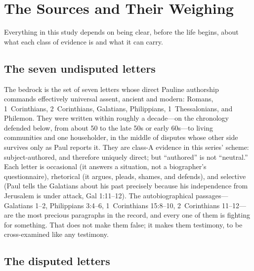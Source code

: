 \section{The Sources and Their Weighing}

Everything in this study depends on being clear, before the life begins,
about what each class of evidence is and what it can carry.

\subsection{The seven undisputed letters}

The bedrock is the set of seven letters whose direct Pauline authorship
commands effectively universal assent, ancient and modern: Romans,
1~Corinthians, 2~Corinthians, Galatians, Philippians, 1~Thessalonians, and
Philemon. They were written within roughly a decade---on the chronology
defended below, from about 50 to the late 50s or early 60s---to living
communities and one householder, in the middle of disputes whose other side
survives only as Paul reports it. They are class-A evidence in this
series' scheme: subject-authored, and therefore uniquely direct; but
``authored'' is not ``neutral.'' Each letter is occasional (it answers a
situation, not a biographer's questionnaire), rhetorical (it argues, pleads,
shames, and defends), and selective (Paul tells the Galatians about his past
precisely because his independence from Jerusalem is under attack, Gal
1:11--12). The autobiographical passages---Galatians 1--2, Philippians
3:4--6, 1~Corinthians 15:8--10, 2~Corinthians 11--12---are the most precious
paragraphs in the record, and every one of them is fighting for something.
That does not make them false; it makes them testimony, to be
cross-examined like any testimony.

\subsection{The disputed letters}

